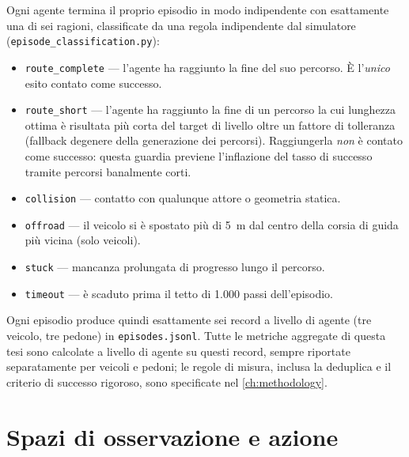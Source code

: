 Ogni agente termina il proprio episodio in modo indipendente con
esattamente una di sei ragioni, classificate da una regola indipendente
dal simulatore (\texttt{episode\_classification.py}):

\begin{itemize}
  \item \texttt{route\_complete} --- l'agente ha raggiunto la fine del
        suo percorso. È l'\emph{unico} esito contato come successo.
  \item \texttt{route\_short} --- l'agente ha raggiunto la fine di un
        percorso la cui lunghezza ottima è risultata più corta del
        target di livello oltre un fattore di tolleranza (fallback
        degenere della generazione dei percorsi). Raggiungerla
        \emph{non} è contato come successo: questa guardia previene
        l'inflazione del tasso di successo tramite percorsi banalmente
        corti.
  \item \texttt{collision} --- contatto con qualunque attore o geometria
        statica.
  \item \texttt{offroad} --- il veicolo si è spostato più di \SI{5}{m}
        dal centro della corsia di guida più vicina (solo veicoli).
  \item \texttt{stuck} --- mancanza prolungata di progresso lungo il
        percorso.
  \item \texttt{timeout} --- è scaduto prima il tetto di 1{.}000 passi
        dell'episodio.
\end{itemize}

Ogni episodio produce quindi esattamente sei record a livello di agente
(tre veicolo, tre pedone) in \texttt{episodes.jsonl}. Tutte le metriche
aggregate di questa tesi sono calcolate a livello di agente su questi
record, sempre riportate separatamente per veicoli e pedoni; le regole
di misura, inclusa la deduplica e il criterio di successo rigoroso, sono
specificate nel \cref{ch:methodology}.

\section{Spazi di osservazione e azione}
\label{sec:obs-actions}

